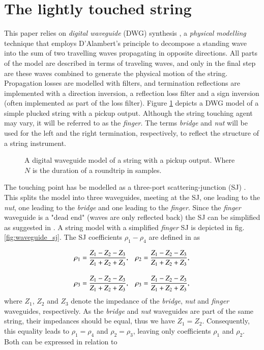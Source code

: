 \documentclass{sigchi}
\begin{document}
\section{The lightly touched string}

This paper relies on \textit{digital waveguide} (DWG) synthesis \cite{smith_physical_1992}, a \textit{physical modelling} technique that employs D'Alambert's principle to decompose a standing wave into the sum of two travelling waves propagating in opposite directions. All parts of the model are described in terms of traveling waves, and only in the final step are these waves combined to generate the physical motion of the string. Propagation losses are modelled with filters, and termination reflections are implemented with a direction inversion, a reflection loss filter and a sign inversion (often implemented as part of the loss filter). Figure \ref{fig:pickup} depicts a DWG model of a simple plucked string with a pickup output. Although the string touching agent may vary, it will be referred to as the \textit{finger}. The terms \textit{bridge} and \textit{nut} will be used for the left and the right termination, respectively, to reflect the structure of a string instrument.

\begin{figure}[h]
	\centering
	\scalebox{0.75}{}
	\caption{A digital waveguide model of a string with a pickup output. Where $N$ is the duration of a roundtrip in samples.}
	\label{fig:pickup}
\end{figure}

The touching point has be modelled as a three-port scattering-junction (SJ) \cite{scavone_digital_1997, valimaki_modeling_1993}. This splits the model into three waveguides, meeting at the SJ, one leading to the \textit{nut}, one leading to the \textit{bridge} and one leading to the \textit{finger}. Since the \textit{finger} waveguide is a "dead end" (waves are only reflected back) the SJ can be simplified as suggested in \cite{pakarinen_physical_2005}. A string model with a simplified \textit{finger} SJ is depicted in fig. \ref{fig:waveguide_sj}. The SJ coefficients $\rho_1 - \rho_4$ are defined in \cite{pakarinen_physical_2005} as

\begin{align} \label{eq:coef}
	\rho_1& = \frac{Z_1-Z_2-Z_3}{Z_1+Z_2+Z_3},&
	\rho_2& = \frac{Z_1-Z_2-Z_3}{Z_1+Z_2+Z_3},\notag\\[1em]
	\rho_3& = \frac{Z_1-Z_2-Z_3}{Z_1+Z_2+Z_3},&
	\rho_3& = \frac{Z_1-Z_2-Z_3}{Z_1+Z_2+Z_3},
\end{align}
where $Z_1$, $Z_2$ and $Z_3$ denote the impedance of the \textit{bridge}, \textit{nut} and \textit{finger} waveguides, respectively. As the \textit{bridge} and \textit{nut} waveguides are part of the same string, their impedances should be equal, thus we have $Z_1=Z_2$. Consequently, this equality leads to $\rho_1=\rho_4$ and $\rho_2=\rho_3$, leaving only coefficients $\rho_1$ and $\rho_2$. Both can be expressed in relation to
\end{document}

